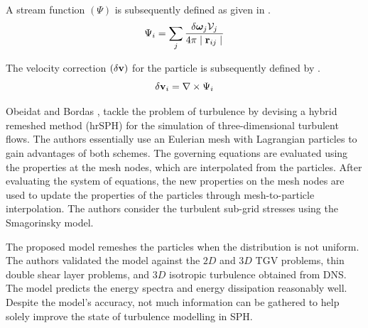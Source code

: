 A stream function $(\Psi)$ is subsequently defined as given in .
\begin{equation}
    \Psi_i = \sum_j \frac{\delta \Vorticity_j \Vol_j}{4\pi \RtwoIJ[]}
    \label{eq:Liu2019-stream-func}
\end{equation}

The velocity correction $(\delta \mathbf{v})$ for the particle is subsequently defined by .
\begin{equation}
    \delta \vect{v}_i = \nabla \times \Psi_i
    \label{eq:Liu2019-vel-update}
\end{equation}

Obeidat and Bordas \parencite{Obeidat2018}, tackle the problem of turbulence by devising a hybrid remeshed method (hrSPH)
for the simulation of three-dimensional turbulent flows. 
The authors essentially use an Eulerian mesh with Lagrangian particles to gain advantages of both schemes. The governing equations are evaluated using the properties at the mesh nodes, which are interpolated from the particles. After evaluating the system of equations, the new properties on the mesh nodes are used to update the properties of the particles through mesh-to-particle interpolation. The authors consider the turbulent sub-grid stresses using the Smagorinsky model.

The proposed model remeshes the particles when the distribution is not uniform. The authors validated the model against the $2D$ and $3D$ TGV problems, thin double shear layer problems, and $3D$ isotropic turbulence obtained from DNS. The model predicts the energy spectra and energy dissipation reasonably well. Despite the model’s accuracy, not much information can be gathered to help solely improve the state of turbulence modelling in SPH.